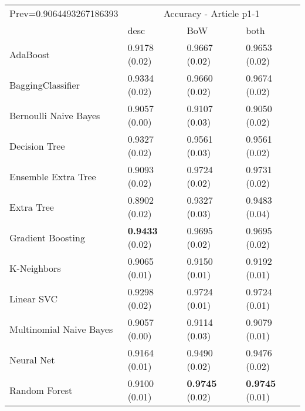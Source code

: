 \begin{tabular}{|l|l|l|l| }
\hline
Prev=0.9064493267186393 &  \multicolumn{3}{c|}{Accuracy - Article p1-1} \\
\cline{2-4} & desc & BoW & both \\ \hline
AdaBoost                & 0.9178 (0.02) & 0.9667 (0.02) & 0.9653 (0.02)\\
BaggingClassifier       & 0.9334 (0.02) & 0.9660 (0.02) & 0.9674 (0.02)\\
Bernoulli Naive Bayes   & 0.9057 (0.00) & 0.9107 (0.03) & 0.9050 (0.02)\\
Decision Tree           & 0.9327 (0.02) & 0.9561 (0.03) & 0.9561 (0.02)\\
Ensemble Extra Tree     & 0.9093 (0.02) & 0.9724 (0.02) & 0.9731 (0.02)\\
Extra Tree              & 0.8902 (0.02) & 0.9327 (0.03) & 0.9483 (0.04)\\
Gradient Boosting       & {\bf 0.9433} (0.02) & 0.9695 (0.02) & 0.9695 (0.02)\\
K-Neighbors             & 0.9065 (0.01) & 0.9150 (0.01) & 0.9192 (0.01)\\
Linear SVC              & 0.9298 (0.02) & 0.9724 (0.01) & 0.9724 (0.01)\\
Multinomial Naive Bayes & 0.9057 (0.00) & 0.9114 (0.03) & 0.9079 (0.01)\\
Neural Net              & 0.9164 (0.01) & 0.9490 (0.02) & 0.9476 (0.02)\\
Random Forest           & 0.9100 (0.01) & {\bf 0.9745} (0.02) & {\bf 0.9745} (0.01)\\
\hline
\end{tabular}